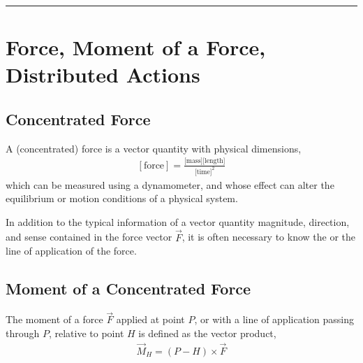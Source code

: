 \documentclass[letterpaper,10pt,english]{jupyterBook}
\begin{document}
\bigskip\hrule\bigskip


\sphinxstepscope


\section{Force, Moment of a Force, Distributed Actions}
\label{\detokenize{ch/actions-types:force-moment-of-a-force-distributed-actions}}\label{\detokenize{ch/actions-types:physics-hs-mechanics-actions-def}}\label{\detokenize{ch/actions-types::doc}}

\subsection{Concentrated Force}
\label{\detokenize{ch/actions-types:concentrated-force}}
\sphinxAtStartPar
A (concentrated) force is a vector quantity with physical dimensions,
\begin{equation*}
\begin{split}[\text{force}] = \frac{\text{[mass]}\text{[length]}}{\text{[time]}^2}\end{split}
\end{equation*}
\sphinxAtStartPar
which can be measured using a dynamometer, and whose effect can alter the equilibrium or motion conditions of a physical system.

\sphinxAtStartPar
In addition to the typical information of a vector quantity \sphinxhyphen{} magnitude, direction, and sense \sphinxhyphen{} contained in the force vector \(\vec{F}\), it is often necessary to know the  or the line of application of the force.


\subsection{Moment of a Concentrated Force}
\label{\detokenize{ch/actions-types:moment-of-a-concentrated-force}}
\sphinxAtStartPar
The moment of a force \(\vec{F}\) applied at point \(P\), or with a line of application passing through \(P\), relative to point \(H\) is defined as the vector product,
\begin{equation*}
\begin{split}\vec{M}_H = (P - H) \times \vec{F}\end{split}
\end{equation*}
\end{document}
